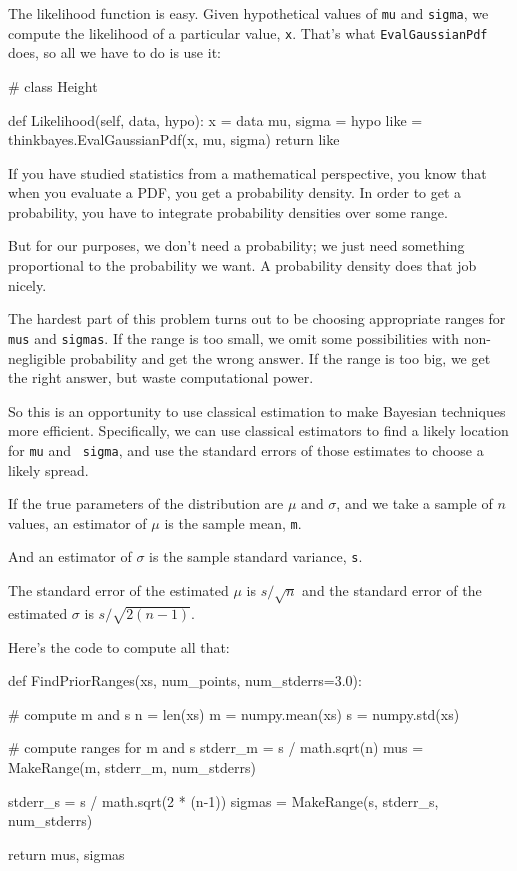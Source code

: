 \documentclass[12pt]{book}
\theoremstyle{exercise}
\begin{document}
The likelihood function is easy.  Given hypothetical values
of {\tt mu} and {\tt sigma}, we compute the likelihood
of a particular value, {\tt x}.  That's what {\tt EvalGaussianPdf}
does, so all we have to do is use it:

\begin{code}
# class Height

    def Likelihood(self, data, hypo):
        x = data
        mu, sigma = hypo
        like = thinkbayes.EvalGaussianPdf(x, mu, sigma)
        return like
\end{code}

If you have studied statistics from a mathematical perspective,
you know that when you evaluate a PDF, you get a probability
density.  In order to get a probability, you have to integrate
probability densities over some range.

But for our purposes, we don't need a probability; we just
need something proportional to the probability we want.
A probability density does that job nicely.

The hardest part of this problem turns
out to be choosing appropriate ranges for {\tt mus} and
{\tt sigmas}.  If the range is too small, we omit some
possibilities with non-negligible probability and get the
wrong answer.  If the range is too big, we get the right answer,
but waste computational power.

So this is an opportunity to use classical estimation to
make Bayesian techniques more efficient.  Specifically, we can use
classical estimators to find a likely location for {\tt mu} and {\tt
  sigma}, and use the standard errors of those estimates to choose a
likely spread.

If the true parameters of the distribution are $\mu$ and $\sigma$, and
we take a sample of $n$ values, an estimator of $\mu$ is the sample
mean, {\tt m}.

And an estimator of $\sigma$ is the sample standard
variance, {\tt s}.

The standard error of the estimated $\mu$ is $s / \sqrt{n}$
and the standard error of the estimated $\sigma$ is
$s / \sqrt{2 (n-1)}$.

Here's the code to compute all that:

\begin{code}
def FindPriorRanges(xs, num_points, num_stderrs=3.0):

    # compute m and s
    n = len(xs)
    m = numpy.mean(xs)
    s = numpy.std(xs)

    # compute ranges for m and s
    stderr_m = s / math.sqrt(n)
    mus = MakeRange(m, stderr_m, num_stderrs)

    stderr_s = s / math.sqrt(2 * (n-1))
    sigmas = MakeRange(s, stderr_s, num_stderrs)

    return mus, sigmas
\end{code}
\end{document}
